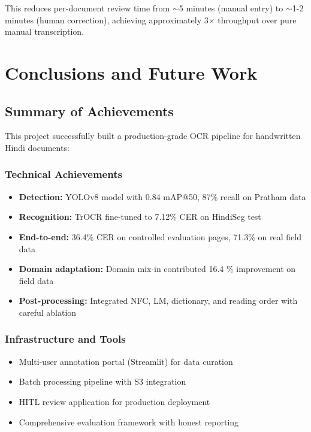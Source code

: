 \documentclass[14pt,a4paper]{article}
\begin{document}
This reduces per-document review time from $\sim$5 minutes (manual entry) to $\sim$1-2 minutes (human correction), achieving approximately 3$\times$ throughput over pure manual transcription.
\newpage
\section{Conclusions and Future Work}

\subsection{Summary of Achievements}

This project successfully built a production-grade OCR pipeline for handwritten Hindi documents:

\subsubsection{Technical Achievements}

\begin{itemize}
    \item \textbf{Detection:} YOLOv8 model with 0.84 mAP@50, 87\% recall on Pratham data
    \item \textbf{Recognition:} TrOCR fine-tuned to 7.12\% CER on HindiSeg test
    \item \textbf{End-to-end:} 36.4\% CER on controlled evaluation pages, 71.3\% on real field data
    \item \textbf{Domain adaptation:} Domain mix-in contributed 16.4 \% improvement on field data
    \item \textbf{Post-processing:} Integrated NFC, LM, dictionary, and reading order with careful ablation
\end{itemize}

\subsubsection{Infrastructure and Tools}

\begin{itemize}
    \item Multi-user annotation portal (Streamlit) for data curation
    \item Batch processing pipeline with S3 integration
    \item HITL review application for production deployment
    \item Comprehensive evaluation framework with honest reporting
\end{itemize}
\end{document}
